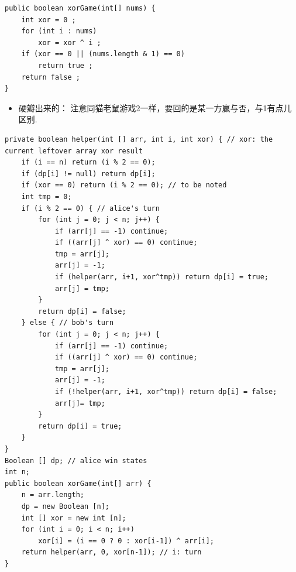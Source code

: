 \documentclass[9pt, b5paaper]{book}
\begin{document}
\begin{verbatim}
public boolean xorGame(int[] nums) {
    int xor = 0 ;
    for (int i : nums) 
        xor = xor ^ i ;
    if (xor == 0 || (nums.length & 1) == 0)
        return true ;
    return false ;
}
\end{verbatim}
\begin{itemize}
\item 硬瓣出来的： 注意同猫老鼠游戏2一样，要回的是某一方赢与否，与1有点儿区别.
\end{itemize}
\begin{verbatim}
private boolean helper(int [] arr, int i, int xor) { // xor: the current leftover array xor result
    if (i == n) return (i % 2 == 0);
    if (dp[i] != null) return dp[i];
    if (xor == 0) return (i % 2 == 0); // to be noted
    int tmp = 0;
    if (i % 2 == 0) { // alice's turn
        for (int j = 0; j < n; j++) {
            if (arr[j] == -1) continue;
            if ((arr[j] ^ xor) == 0) continue;
            tmp = arr[j];
            arr[j] = -1;
            if (helper(arr, i+1, xor^tmp)) return dp[i] = true;
            arr[j] = tmp;
        }
        return dp[i] = false;
    } else { // bob's turn
        for (int j = 0; j < n; j++) {
            if (arr[j] == -1) continue;
            if ((arr[j] ^ xor) == 0) continue;
            tmp = arr[j];
            arr[j] = -1;
            if (!helper(arr, i+1, xor^tmp)) return dp[i] = false;
            arr[j]= tmp;
        }
        return dp[i] = true;
    }
}
Boolean [] dp; // alice win states
int n;
public boolean xorGame(int[] arr) {
    n = arr.length;
    dp = new Boolean [n];
    int [] xor = new int [n];
    for (int i = 0; i < n; i++) 
        xor[i] = (i == 0 ? 0 : xor[i-1]) ^ arr[i];
    return helper(arr, 0, xor[n-1]); // i: turn
}
\end{verbatim}
\end{document}
